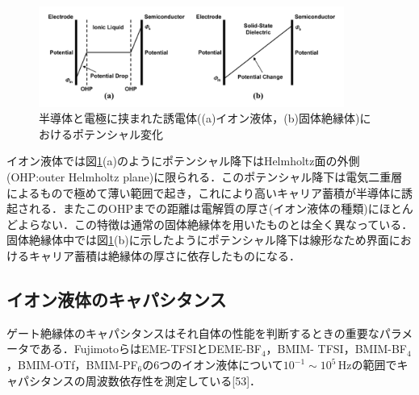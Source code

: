 \begin{figure}[t]
 \begin{center}
  \includegraphics[width=100mm]{images/potentialchanges.png}
\end{center}
 \caption{半導体と電極に挟まれた誘電体((a)イオン液体，(b)固体絶縁体)におけるポテンシャル変化}
 \label{potentialchnages}
\end{figure}

イオン液体では図\ref{potentialchnages}(a)のようにポテンシャル降下はHelmholtz面の外側(OHP:outer Helmholtz plane)に限られる．このポテンシャル降下は電気二重層によるもので極めて薄い範囲で起き，これにより高いキャリア蓄積が半導体に誘起される．またこのOHPまでの距離は電解質の厚さ(イオン液体の種類)にほとんどよらない．この特徴は通常の固体絶縁体を用いたものとは全く異なっている．固体絶縁体中では図\ref{potentialchnages}(b)に示したようにポテンシャル降下は線形なため界面におけるキャリア蓄積は絶縁体の厚さに依存したものになる．


\subsection{イオン液体のキャパシタンス}
ゲート絶縁体のキャパシタンスはそれ自体の性能を判断するときの重要なパラメータである．FujimotoらはEME-TFSIとDEME-BF$_{4}$，BMIM- TFSI，BMIM-BF$_{4}$，BMIM-OTf，BMIM-PF$_{6}$の6つのイオン液体について$10^{-1}\sim10^{5}\,\mathrm{Hz}$の範囲でキャパシタンスの周波数依存性を測定している[53]．

